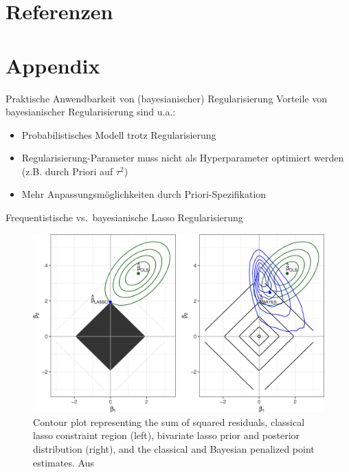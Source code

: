 \documentclass[
  ignorenonframetext,
  aspectratio=169,
]{beamer}
\providecommand{\tightlist}{%
  \setlength{\itemsep}{0pt}\setlength{\parskip}{0pt}}
\newcommand{\taus}{\tau^2}
\begin{document}
\section{Referenzen}\label{referenzen}

\section{Appendix}\label{appendix}

\begin{frame}{Praktische Anwendbarkeit von (bayesianischer)
Regularisierung}
\protect{}\label{praktische-anwendbarkeit-von-bayesianischer-regularisierung}
Vorteile von bayesianischer Regularisierung sind u.a.:

\begin{itemize}
\tightlist
\item
  Probabilistisches Modell trotz Regularisierung
\item
  Regularisierung-Parameter muss nicht als Hyperparameter optimiert
  werden (z.B. durch Priori auf \(\taus\))
\item
  Mehr Anpassungsmöglichkeiten durch Priori-Spezifikation
\end{itemize}
\end{frame}

\begin{frame}{Frequentistische vs.~bayesianische Lasso Regularisierung}
\protect{}\label{frequentistische-vs.-bayesianische-lasso-regularisierung}
\begin{figure}
\centering
\includegraphics[width=\linewidth,height=0.75\textheight,keepaspectratio]{../figures/van_erp_fig2_lasso.jpg}
\caption{Contour plot representing the sum of squared residuals,
classical lasso constraint region (left), bivariate lasso prior and
posterior distribution (right), and the classical and Bayesian penalized
point estimates. Aus \textcite{van_erp_shrinkage_2019}}
\end{figure}
\end{frame}
\end{document}

